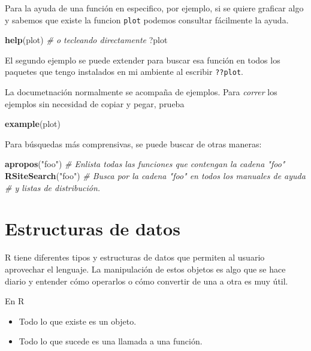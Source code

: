 \documentclass[]{article}
\newenvironment{Shaded}{\begin{snugshade}}{\end{snugshade}}
\newcommand{\KeywordTok}[1]{\textcolor[rgb]{0.13,0.29,0.53}{\textbf{{#1}}}}
\newcommand{\StringTok}[1]{\textcolor[rgb]{0.31,0.60,0.02}{{#1}}}
\newcommand{\CommentTok}[1]{\textcolor[rgb]{0.56,0.35,0.01}{\textit{{#1}}}}
\newcommand{\NormalTok}[1]{{#1}}
\begin{document}
Para la ayuda de una función en especifico, por ejemplo, si se quiere
graficar algo y sabemos que existe la funcion \texttt{plot} podemos
consultar fácilmente la ayuda.

\begin{Shaded}
\begin{Highlighting}[]
\KeywordTok{help}\NormalTok{(plot)}
\CommentTok{# o tecleando directamente}
\NormalTok{?plot}
\end{Highlighting}
\end{Shaded}

El segundo ejemplo se puede extender para buscar esa función en todos
los paquetes que tengo instalados en mi ambiente al escribir
\texttt{??plot}.

La documetnación normalmente se acompaña de ejemplos. Para \emph{correr}
los ejemplos sin necesidad de copiar y pegar, prueba

\begin{Shaded}
\begin{Highlighting}[]
\KeywordTok{example}\NormalTok{(plot)}
\end{Highlighting}
\end{Shaded}

Para búsquedas más comprensivas, se puede buscar de otras maneras:

\begin{Shaded}
\begin{Highlighting}[]
\KeywordTok{apropos}\NormalTok{(}\StringTok{"foo"}\NormalTok{) }\CommentTok{# Enlista todas las funciones que contengan la cadena "foo"}
\KeywordTok{RSiteSearch}\NormalTok{(}\StringTok{"foo"}\NormalTok{) }\CommentTok{# Busca por la cadena "foo" en todos los manuales de ayuda }
\CommentTok{# y listas de distribución.}
\end{Highlighting}
\end{Shaded}

\section{Estructuras de datos}\label{estructuras-de-datos}

R tiene diferentes tipos y estructuras de datos que permiten al usuario
aprovechar el lenguaje. La manipulación de estos objetos es algo que se
hace diario y entender cómo operarlos o cómo convertir de una a otra es
muy útil.

\renewcommand\bcStyleTitre[1]{\large\textcolor{ttblue}{#1}}

\begin{bclogo}[
  couleur=bgblue,
  arrondi=0,
  logo=\bcattention,
  barre=none,
  noborder=true]{En R}
\begin{itemize}
\item Todo lo que existe es un objeto.
\item Todo lo que sucede es una llamada a una función.
\end{itemize}
\end{bclogo}
\end{document}
